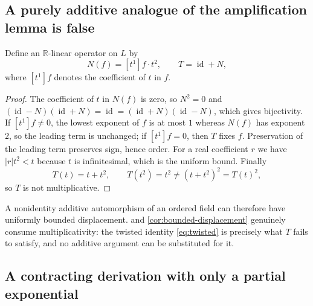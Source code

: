\documentclass[11pt]{article}
\newtheorem{proposition}[theorem]{Proposition}
\theoremstyle{definition}
\theoremstyle{remark}
\newcommand{\R}{\mathbb{R}}
\newcommand{\id}{\operatorname{id}}
\newcommand{\abs}[1]{\lvert #1\rvert}
\numberwithin{equation}{section}
\begin{document}
\subsection{A purely additive analogue of the amplification lemma is false}

Define an $\R$-linear operator on $L$ by
\[
 N(f)=[t^{1}]f\cdot t^{2},\qquad T=\id+N,
\]
where $[t^{1}]f$ denotes the coefficient of $t$ in $f$.

\begin{proof}
The coefficient of $t$ in $N(f)$ is zero, so $N^{2}=0$ and
$(\id-N)(\id+N)=\id=(\id+N)(\id-N)$, which gives bijectivity. If
$[t^{1}]f\ne0$, the lowest exponent of $f$ is at most $1$ whereas $N(f)$ has
exponent $2$, so the leading term is unchanged; if $[t^{1}]f=0$, then $T$
fixes $f$. Preservation of the leading term preserves sign, hence order.
For a real coefficient $r$ we have $\abs r t^{2}<t$ because $t$ is
infinitesimal, which is the uniform bound. Finally
\[
 T(t)=t+t^{2},\qquad T(t^{2})=t^{2}\ne(t+t^{2})^{2}=T(t)^{2},
\]
so $T$ is not multiplicative.
\end{proof}

A nonidentity additive automorphism of an ordered field can therefore have
uniformly bounded displacement.  and
\cref{cor:bounded-displacement} genuinely consume multiplicativity: the
twisted identity \eqref{eq:twisted} is precisely what $T$ fails to satisfy,
and no additive argument can be substituted for it.

\subsection{A contracting derivation with only a partial exponential}
\end{document}
